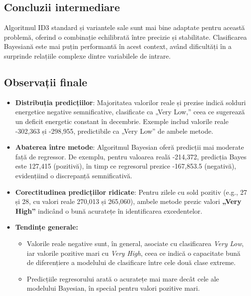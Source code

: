 \documentclass[a4paper,12pt]{article}
\begin{document}
\subsection{Concluzii intermediare}
Algoritmul ID3 standard și variantele sale sunt mai bine adaptate pentru această problemă, oferind o combinație echilibrată între precizie și stabilitate. Clasificarea Bayesiană este mai puțin performantă în acest context, având dificultăți în a surprinde relațiile complexe dintre variabilele de intrare.

\subsection{Observații finale}
\begin{itemize}
    \item \textbf{Distribuția predicțiilor}: Majoritatea valorilor reale și prezise indică solduri energetice negative semnificative, clasificate ca „Very Low,” ceea ce sugerează un deficit energetic constant în decembrie. Exemple includ valorile reale -302,363 și -298,955, predictibile ca „Very Low” de ambele metode.
    \item \textbf{Abaterea între metode}: Algoritmul Bayesian oferă predicții mai moderate față de regressor. De exemplu, pentru valoarea reală -214,372, predicția Bayes este 127,415 (pozitivă), în timp ce regresorul prezice -167,853.5 (negativă), evidențiind o discrepanță semnificativă.
    \item \textbf{Corectitudinea predicțiilor ridicate}: Pentru zilele cu sold pozitiv (e.g., 27 și 28, cu valori reale 270,013 și 265,060), ambele metode prezic valori \textbf{„Very High”} indicând o bună acuratețe în identificarea excedentelor.
    \item \textbf{Tendințe generale:}
        \begin{itemize}
            \item Valorile reale negative sunt, în general, asociate cu clasificarea \textit{Very Low}, iar valorile pozitive mari cu \textit{Very High}, ceea ce indică o capacitate bună de diferențiere a modelului de clasificare între cele două clase extreme. \\
            \item Predicțiile regresorului arată o acuratețe mai mare decât cele ale modelului Bayesian, în special pentru valori pozitive mari. \\
        \end{itemize}
\end{itemize}
\end{document}
